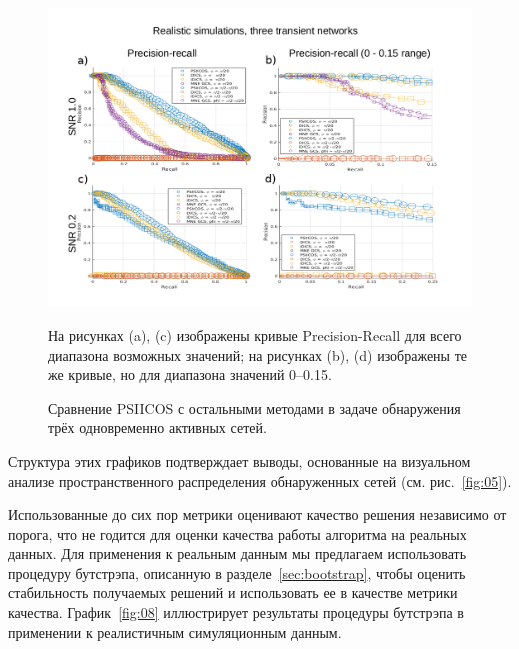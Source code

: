 \begin{figure}[!ht]
 \includegraphics[width=\textwidth]{../images/psiicos_paper/Figure7_hr.jpg}
 \caption{Сравнение PSIICOS с остальными методами в задаче обнаружения трёх
 одновременно активных сетей.}\label{fig:07} %
 На рисунках (a), (c) изображены кривые Precision-Recall для всего диапазона
 возможных значений; на рисунках (b), (d) изображены те же кривые, но для
 диапазона значений 0--0.15.
\end{figure}%

Структура этих графиков подтверждает выводы, основанные на визуальном анализе
пространственного распределения обнаруженных сетей (см. рис.~\ref{fig:05}).

Использованные до сих пор метрики оценивают качество решения независимо от порога,
что не годится для оценки качества работы алгоритма на реальных данных.
Для применения к реальным данным мы предлагаем использовать процедуру бутстрэпа,
описанную в разделе~\ref{sec:bootstrap}, чтобы оценить стабильность
получаемых решений и использовать ее в качестве метрики качества.
График~\ref{fig:08} иллюстрирует результаты процедуры
бутстрэпа в применении к реалистичным симуляционным данным.

